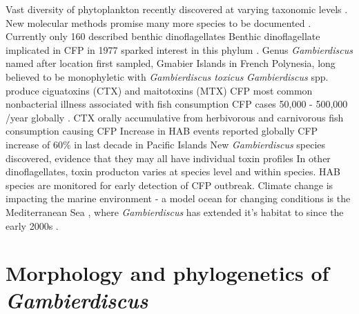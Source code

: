 \documentclass[12pt]{article}
\begin{document}
Vast diversity of phytoplankton recently discovered at varying taxonomic levels \cite{simon2009diversity}. 
New molecular methods promise many more species to be documented \cite{murray2012genetic,murray2012transcriptomics}.
Currently only 160 described benthic dinoflagellates \cite{taylor2008dinoflagellate} %
Benthic dinoflagellate implicated in CFP in 1977 sparked interest in this phylum \cite{yasumoto1977finding}.
Genus \emph{Gambierdiscus} named after location first sampled, Gmabier Islands in French Polynesia, long believed to be monophyletic with \emph{Gambierdiscus toxicus} \cite{adachi1979thecal} %
\emph{Gambierdiscus} spp. produce ciguatoxins (CTX) and maitotoxins (MTX) \cite{chinain1997intraspecific,chinain1999morphology,chinain1999seasonal,chinain2010growth,holmes1998gambierdiscus,rhodes2010toxic,fraga2011gambierdiscus,holland2013differences}
CFP most common nonbacterial illness associated with fish consumption \cite{friedman2008ciguatera} %
CFP cases 50,000 - 500,000 /year globally \cite{fleming1998seafood}.
CTX orally accumulative from herbivorous and carnivorous fish consumption causing CFP \cite{bagnis1979clinical,gillespie1987possible,sims1987theoretical} %
Increase in HAB events reported globally \cite{hallegraeff2010ocean} %
CFP increase of 60\% in last decade in Pacific Islands \cite{skinner2011ciguatera}
New \emph{Gambierdiscus} species discovered, evidence that they may all have individual toxin profiles \cite{chinain2010growth,fraga2011gambierdiscus,holland2013differences}
In other dinoflagellates, toxin producton varies at species level and within species.
HAB species are monitored for early detection of CFP outbreak.
Climate change is impacting the marine environment - a model ocean for changing conditions is the Mediterranean Sea \cite{lejeusne2010climate}, where \emph{Gambierdiscus} has extended it's habitat to since the early 2000s \cite{aligizaki2008morphological}.

\section{Morphology and phylogenetics of \emph{Gambierdiscus}}
\end{document}

